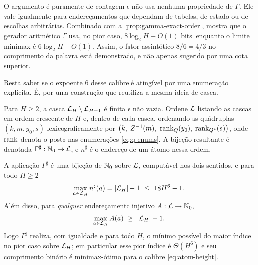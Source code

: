 \begin{remark}
O argumento é puramente de contagem e não usa nenhuma propriedade de $\Gamma$. Ele vale igualmente para endereçamentos que dependam de tabelas, de estado ou de escolhas arbitrárias. Combinado com a \cref{prop:gamma-exact-order}, mostra que o gerador aritmético $\Gamma$ usa, no pior caso, $8\log_2H+O(1)$ bits, enquanto o limite minimax é $6\log_2H+O(1)$. Assim, o fator assintótico $8/6=4/3$ no comprimento da palavra está demonstrado, e não apenas sugerido por uma cota superior.
\end{remark}

Resta saber se o expoente $6$ desse calibre é atingível por uma enumeração
explícita. É, por uma construção que reutiliza a mesma ideia de casca.

\begin{definition}\label{def:sharp}
Para $H\ge2$, a casca $\mathcal{L}_H\setminus\mathcal{L}_{H-1}$ é finita e não vazia. Ordene $\mathcal{L}$ listando as cascas em ordem crescente de $H$ e, dentro de cada casca, ordenando as quádruplas $(k,m,y_0,s)$ lexicograficamente por $\bigl(k,\ Z^{-1}(m),\ \rank_Q(y_0),\ \rank_{Q^*}(s)\bigr)$, onde $\operatorname{rank}$ denota o posto nas enumerações \eqref{eq:q-enums}. A bijeção resultante é denotada $\Gamma^\sharp:\mathbb{N}_0\to\mathcal{L}$, e $n^\sharp$ é o endereço de um átomo nessa ordem.
\end{definition}

\begin{theorem}\label{thm:sharp-optimal}
A aplicação $\Gamma^\sharp$ é uma bijeção de $\mathbb{N}_0$ sobre $\mathcal{L}$, computável nos dois sentidos, e para todo $H\ge2$
\begin{equation}
 \max_{a\in\Library_H}n^\sharp(a)=|\Library_H|-1\ \le\ 18H^6-1 .
 \label{eq:sharp-upper}
\end{equation}
Além disso, para \emph{qualquer} endereçamento injetivo $A:\mathcal{L}\to\mathbb{N}_0$,
\begin{equation}
 \max_{a\in\mathcal{L}_H}A(a)\ \ge\ |\mathcal{L}_H|-1 .
 \label{eq:sharp-minimax}
\end{equation}
Logo $\Gamma^\sharp$ realiza, com igualdade e para todo $H$, o mínimo possível
do maior índice no pior caso sobre $\mathcal{L}_H$; em particular esse pior
índice é $\Theta(H^6)$ e seu comprimento binário é minimax-ótimo para o
calibre \eqref{eq:atom-height}.
\end{theorem}

